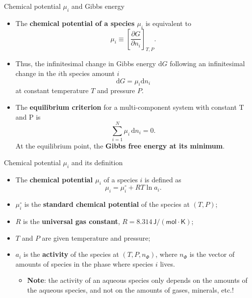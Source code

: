 %
%
\begin{frame}[<+->]{Chemical potential $\mu_{i}$ and Gibbs energy}
\begin{itemize}
\item The \alert{\bf chemical potential of a species $\mu_{i}$} is equivalent to
\[
\mu_{i}\equiv\left[\frac{\partial G}{\partial n_{i}}\right]_{T,P}.
\]
%
\item Thus, the infinitesimal change in Gibbs energy $\mathrm{d}G$ following an infinitesimal change in the $i$th species amount $i$ 
%
\[
\mathrm{d}G=\mu_{i}\mathrm{d}n_{i}
\]
at constant temperature $T$ and pressure $P$.
\item The \textbf{equilibrium criterion} for a multi-component system with constant T and P is
\[
\sum_{i=1}^N \mu_i \, \mathrm{d}n_{i} = 0.
\]
At the equilibrium point, the \textbf{Gibbs free energy at its minimum}.
%
\end{itemize}
\end{frame}
%
%
\begin{frame}{Chemical potential $\mu_{i}$ and its definition}
\begin{itemize}
\item The \alert{\textbf{chemical potential $\mu_{i}$}} of a species $i$ is defined as
\[
\boxed{
\mu_{i}=\mu_{i}^{\circ}+RT\ln a_{i}.
}
\]
\vskip -10pt
%
\pause
\item $\mu_{i}^{\circ}$ is the \alert{\bf standard chemical potential} of
the species at $(T,P)$;
\pause
\item $R$ is the \alert{\bf universal gas constant}, $R= 8.314 \, \mathsf{J/(mol \cdot K)}$;
\pause
\item $T$ and $P$ are given temperature and pressure;
\pause
\item $a_{i}$ is the \alert{\bf activity} of the species at $(T,P,n_{\Phi})$,
where $n_{\Phi}$ is the vector of amounts of species in the phase
where species $i$ lives.
\begin{itemize}
\item \textbf{Note}: the activity of an aqueous species only depends on the
amounts of the aqueous species, and not on the amounts of gases, minerals,
etc.!
\end{itemize}

\end{itemize}
\end{frame}
